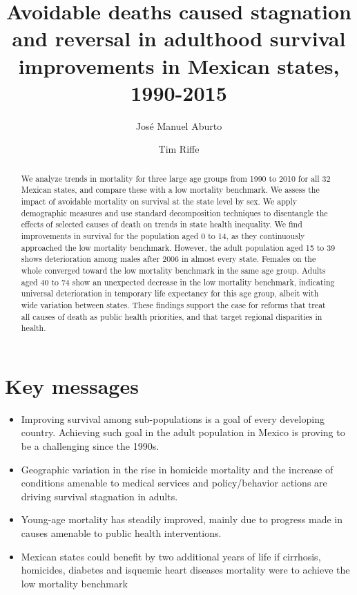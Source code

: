 \documentclass[11.5pt]{article}
\title{Avoidable deaths caused stagnation and reversal in adulthood survival improvements in Mexican states, 1990-2015}
\author[1]{Jos\'e Manuel Aburto}
\author[2]{Tim Riffe}
\affil[1]{Max Planck Odense Center on the Biodemography of Aging, University of Southern Denmark}
\affil[2]{Max Planck Institute for Demographic Research}
\begin{document}
\maketitle

\begin{abstract}
We analyze trends in mortality for three large age groups from 1990 to 2010 for all 32 Mexican states, and compare these with a low mortality benchmark. We assess the impact of avoidable mortality on survival at the state level by sex. We apply demographic measures and use standard decomposition techniques to disentangle the effects of selected causes of death on trends in state health inequality. We find improvements in survival for the population aged 0 to 14, as they continuously approached the low mortality benchmark. However, the adult population aged 15 to 39 shows deterioration among males after 2006 in almost every state. Females on the whole converged toward the low mortality benchmark in the same age group. Adults aged 40 to 74 show an unexpected decrease in the low mortality benchmark, indicating universal deterioration in temporary life expectancy for this age group, albeit with wide variation between states. These findings support the case for reforms that treat all causes of death as public health priorities, and that target regional disparities in health.

\end{abstract}

\section*{Key messages}
\begin{itemize}
\item Improving survival among sub-populations is a goal of every developing country. Achieving such goal in the adult population in Mexico is proving to be a challenging since the 1990s.
\item Geographic variation in the rise in homicide mortality and the increase of conditions amenable to medical services and policy/behavior actions are driving survival stagnation in adults.
\item Young-age mortality has steadily improved, mainly due to progress made in causes amenable to public health interventions.
\item Mexican states could benefit by two additional years of life if  cirrhosis, homicides, diabetes and isquemic heart diseases mortality were to achieve the low mortality benchmark 
\end{itemize}
\end{document}
